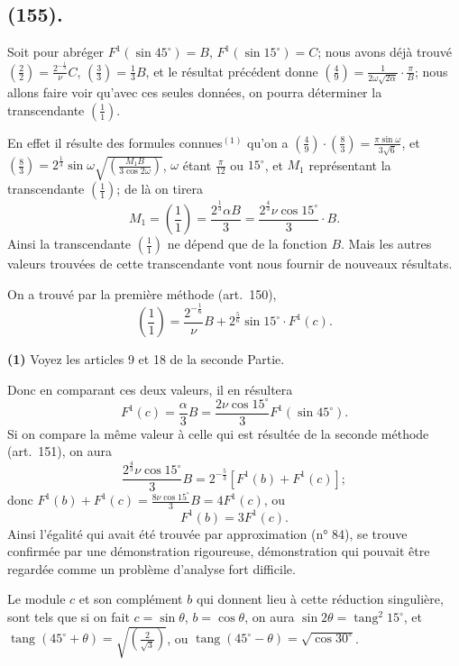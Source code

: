 \documentclass{article}
\begin{document}
\subsection*{(155).}

Soit pour abréger $F^{1}(\sin 45^{\circ})=B$, $F^{1}(\sin 15^{\circ})=C$; nous avons déjà trouvé $\left(\frac{2}{2}\right)=\frac{2^{-\frac{1}{3}}}{\nu}C$, $\left(\frac{3}{3}\right)=\frac{1}{3}B$, et le résultat précédent donne $\left(\frac{4}{9}\right)=\frac{1}{2\omega\sqrt{2\alpha}}\cdot\frac{\pi}{B}$; nous allons faire voir qu'avec ces seules données, on pourra déterminer la transcendante $\left(\frac{1}{1}\right)$.

En effet il résulte des formules connues${}^{(1)}$ qu'on a $\left(\frac{4}{9}\right)\cdot\left(\frac{8}{3}\right)=\frac{\pi\sin\omega}{3\sqrt{6}}$, et $\left(\frac{8}{3}\right)=2^{\frac{1}{3}}\sin\omega\sqrt{\left(\frac{M_{1}B}{3\cos 2\omega}\right)}$, $\omega$ étant $\frac{\pi}{12}$ ou $15^{\circ}$, et $M_{1}$ représentant la transcendante $\left(\frac{1}{1}\right)$; de là on tirera
\[ M_{1}=\left(\frac{1}{1}\right)=\frac{2^{\frac{1}{3}}\alpha B}{3}=\frac{2^{\frac{4}{3}}\nu\cos 15^{\circ}}{3}\cdot B. \]
Ainsi la transcendante $\left(\frac{1}{1}\right)$ ne dépend que de la fonction $B$. Mais les autres valeurs trouvées de cette transcendante vont nous fournir de nouveaux résultats.

On a trouvé par la première méthode (art.\ 150),
\[ \left(\frac{1}{1}\right)=\frac{2^{-\frac{1}{6}}}{\nu}B+2^{\frac{5}{6}}\sin 15^{\circ}\cdot F^{1}(c). \]

\textbf{(1)} Voyez les articles 9 et 18 de la seconde Partie.


Donc en comparant ces deux valeurs, il en résultera
\[ F^{1}(c)=\frac{\alpha}{3}B=\frac{2\nu\cos 15^{\circ}}{3}F^{1}(\sin 45^{\circ}). \]
Si on compare la même valeur à celle qui est résultée de la seconde méthode (art.\ 151), on aura
\[ \frac{2^{\frac{4}{3}}\nu\cos 15^{\circ}}{3}B=2^{-\frac{5}{3}}[F^{1}(b)+F^{1}(c)]; \]
donc $F^{1}(b)+F^{1}(c)=\frac{8\nu\cos 15^{\circ}}{3}B=4F^{1}(c)$, ou
\[ F^{1}(b)=3F^{1}(c). \]
Ainsi l'égalité qui avait été trouvée par approximation (n° 84), se trouve confirmée par une démonstration rigoureuse, démonstration qui pouvait être regardée comme un problème d'analyse fort difficile.

Le module $c$ et son complément $b$ qui donnent lieu à cette réduction singulière, sont tels que si on fait $c=\sin\theta$, $b=\cos\theta$, on aura $\sin 2\theta=\operatorname{tang}^{2}15^{\circ}$, et $\operatorname{tang}(45^{\circ}+\theta)=\sqrt{\left(\frac{2}{\sqrt{3}}\right)}$, ou $\operatorname{tang}(45^{\circ}-\theta)=\sqrt{\cos 30^{\circ}}$.
\end{document}
